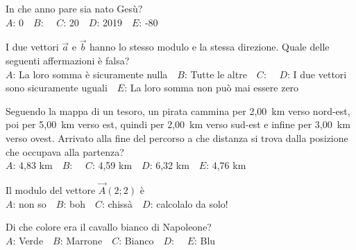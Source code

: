 \def\mcserialnumber{24}
\mcpaperheader


\def\mcquestionnumber{1}


\mcquestionheader In che anno pare sia nato Gesù?\\
{$A$}: 0\ \ {$B$}: \ \ {$C$}: 20\ \ {$D$}: 2019\ \ {$E$}: -80\ \ 

\mcquestionfooter



\def\mcquestionnumber{2}


\mcquestionheader I due vettori $\vec{a}$ e $\vec{b}$ hanno lo stesso modulo e la stessa direzione. Quale delle seguenti affermazioni è falsa?\\
{$A$}: La loro somma è sicuramente nulla\ \ {$B$}: Tutte le altre\ \ {$C$}: \ \ {$D$}: I due vettori sono sicuramente uguali\ \ {$E$}: La loro somma non può mai essere zero\ \ 

\mcquestionfooter



\def\mcquestionnumber{3}


\mcquestionheader Seguendo la mappa di un tesoro, un pirata cammina per 2,00~km verso nord-est, poi per 5,00~km verso est, quindi per 2,00~km verso sud-est e infine per 3,00~km verso ovest. Arrivato alla fine del percorso a che distanza si trova dalla posizione che occupava alla partenza?\\
{$A$}: 4,83 km\ \ {$B$}: \ \ {$C$}: 4,59 km\ \ {$D$}: 6,32 km\ \ {$E$}: 4,76 km\ \ 

\mcquestionfooter



\def\mcquestionnumber{4}


\mcquestionheader Il modulo del vettore $\vec{A}(2;2)$ è\\
{$A$}: non so\ \ {$B$}: boh\ \ {$C$}: chissà\ \ {$D$}: calcolalo da solo!\ \ 

\mcquestionfooter



\def\mcquestionnumber{5}


\mcquestionheader Di che colore era il cavallo bianco di Napoleone?\\
{$A$}: Verde\ \ {$B$}: Marrone\ \ {$C$}: Bianco\ \ {$D$}: \ \ {$E$}: Blu\ \ 

\mcquestionfooter



\def\mcquestionnumber{6}


